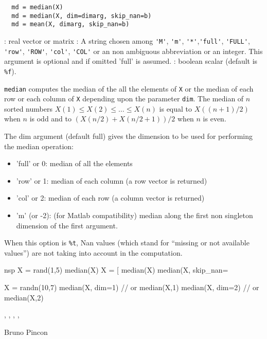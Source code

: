 
\begin{mandesc}
\end{mandesc}

\begin{calling_sequence}
\begin{verbatim}
  md = median(X)
  md = median(X, dim=dimarg, skip_nan=b)  
  md = mean(X, dimarg, skip_nan=b)  
\end{verbatim}
\end{calling_sequence}
\begin{parameters}
  \begin{varlist}
    : real vector or matrix
    : A string chosen among \verb+'M'+, \verb+'m'+, \verb+'*'+,\verb+'full'+, \verb+'FULL'+, \verb+'row'+,
    \verb+'ROW'+, \verb+'col'+, \verb+'COL'+ or an non ambiguous abbreviation or an integer. 
    This argument is optional and if omitted 'full' is assumed.
    : boolean scalar (default is \verb+%f+).
  \end{varlist}
\end{parameters}

\begin{mandescription}
  \verb+median+ computes the median of the all the elements of \verb+X+
or the median of each row or each column of \verb+X+ depending upon
the parameter \verb+dim+. The median of $n$ sorted numbers 
$X(1) \le X(2) \le \dots \le X(n)$ is equal to $X((n+1)/2)$ when $n$
is odd and to  $(X(n/2)+X(n/2+1))/2$ when $n$ is even.

  The dim argument (default full) gives the dimension to be used for performing the median operation:
  \begin{itemize}
    \item 'full' or 0: median of all the elements 
    \item 'row' or 1: median of each column (a row vector is returned)
    \item 'col' or 2: median of each row (a column vector is returned)
    \item 'm' (or -2): (for Matlab compatibility) median along the first non 
          singleton dimension of the first argument.
  \end{itemize}

   When this option is \verb+%t+,  Nan values (which stand for ``missing or not 
 available values'') are not taking into account in the computation.
\end{mandescription}
\begin{examples}
\begin{mintednsp}{nsp}
X = rand(1,5)
median(X)
X = [%
median(X)
median(X, skip_nan=%

X = randn(10,7)
median(X, dim=1) // or median(X,1)
median(X, dim=2) // or median(X,2)
\end{mintednsp}
\end{examples}

\begin{manseealso}
   , , , , 
\end{manseealso}

\begin{authors}
 Bruno Pincon
\end{authors}
